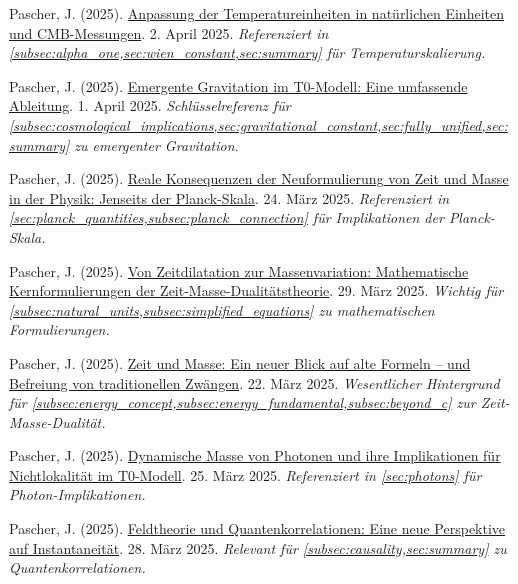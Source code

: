 \documentclass[12pt,a4paper]{article}
\begin{document}
\begin{thebibliography}{99}
		 Pascher, J. (2025). \href{https://github.com/jpascher/T0-Time-Mass-Duality/tree/main/2/pdf/Deutsch/TempEinheitenCMB.pdf}{Anpassung der Temperatureinheiten in natürlichen Einheiten und CMB-Messungen}. 2. April 2025. \textit{Referenziert in \cref{subsec:alpha_one,sec:wien_constant,sec:summary} für Temperaturskalierung.}
		
		 Pascher, J. (2025). \href{https://github.com/jpascher/T0-Time-Mass-Duality/tree/main/2/pdf/Deutsch/EmergentGravT0.pdf}{Emergente Gravitation im T0-Modell: Eine umfassende Ableitung}. 1. April 2025. \textit{Schlüsselreferenz für \cref{subsec:cosmological_implications,sec:gravitational_constant,sec:fully_unified,sec:summary} zu emergenter Gravitation.}
		
		 Pascher, J. (2025). \href{https://github.com/jpascher/T0-Time-Mass-Duality/tree/main/2/pdf/Deutsch/JenseitsPlanck.pdf}{Reale Konsequenzen der Neuformulierung von Zeit und Masse in der Physik: Jenseits der Planck-Skala}. 24. März 2025. \textit{Referenziert in \cref{sec:planck_quantities,subsec:planck_connection} für Implikationen der Planck-Skala.}
		
		 Pascher, J. (2025). \href{https://github.com/jpascher/T0-Time-Mass-Duality/tree/main/2/pdf/Deutsch/MathZeitMasseLagrange.pdf}{Von Zeitdilatation zur Massenvariation: Mathematische Kernformulierungen der Zeit-Masse-Dualitätstheorie}. 29. März 2025. \textit{Wichtig für \cref{subsec:natural_units,subsec:simplified_equations} zu mathematischen Formulierungen.}
		
		 Pascher, J. (2025). \href{https://github.com/jpascher/T0-Time-Mass-Duality/tree/main/2/pdf/Deutsch/ZeitMasseNeuerBlick.pdf}{Zeit und Masse: Ein neuer Blick auf alte Formeln – und Befreiung von traditionellen Zwängen}. 22. März 2025. \textit{Wesentlicher Hintergrund für \cref{subsec:energy_concept,subsec:energy_fundamental,subsec:beyond_c} zur Zeit-Masse-Dualität.}
		
		 Pascher, J. (2025). \href{https://github.com/jpascher/T0-Time-Mass-Duality/tree/main/2/pdf/Deutsch/DynMassePhotonenNichtlokal.pdf}{Dynamische Masse von Photonen und ihre Implikationen für Nichtlokalität im T0-Modell}. 25. März 2025. \textit{Referenziert in \cref{sec:photons} für Photon-Implikationen.}
		
		 Pascher, J. (2025). \href{https://github.com/jpascher/T0-Time-Mass-Duality/tree/main/2/pdf/Deutsch/FeldtheorieQuanten.pdf}{Feldtheorie und Quantenkorrelationen: Eine neue Perspektive auf Instantaneität}. 28. März 2025. \textit{Relevant für \cref{subsec:causality,sec:summary} zu Quantenkorrelationen.}
		

\end{thebibliography}
\end{document}
